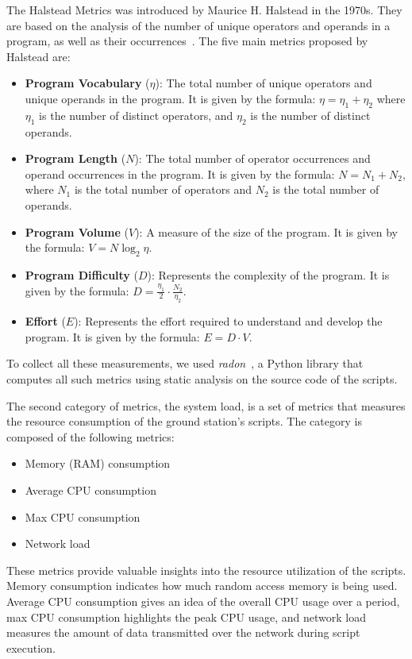 The Halstead Metrics was introduced by Maurice H. Halstead in the 1970s. 
They are based on the analysis of the number of unique operators and operands in a program, as well as their occurrences~\cite{hariprasad2017software}.
The five main metrics proposed by Halstead are:
\begin{itemize}
    \item \textbf{Program Vocabulary} (\( \eta \)): The total number of unique operators and unique operands in the program. 
    It is given by the formula: \( \eta = \eta_1 + \eta_2 \) where \( \eta_1 \) is the number of distinct operators, and  \( \eta_2 \) is the number of distinct operands.
    \item \textbf{Program Length} (\( N \)): The total number of operator occurrences and operand occurrences in the program. It is given by the formula: \( N = N_1 + N_2 \), where \( N_1 \) is the total number of operators and \( N_2 \) is the total number of operands.
    \item \textbf{Program Volume} (\( V \)): A measure of the size of the program. It is given by the formula: \( V = N \log_2 \eta \).
    \item \textbf{Program Difficulty} (\( D \)): Represents the complexity of the program. It is given by the formula: \( D = \frac{\eta_1}{2} \cdot \frac{N_2}{\eta_2} \).
    \item \textbf{Effort} (\( E \)): Represents the effort required to understand and develop the program. It is given by the formula: \( E = D \cdot V \).
\end{itemize}

To collect all these measurements, we used \textit{radon}~\cite{radon}, a Python library that computes all such metrics using static analysis on the source code of the scripts.

The second category of metrics, the system load, is a set of metrics that measures the resource consumption of the ground station's scripts.
The category is composed of the following metrics:
\begin{itemize}
    \item Memory (RAM) consumption
    \item Average CPU consumption 
    \item Max CPU consumption
    \item Network load
\end{itemize}

These metrics provide valuable insights into the resource utilization of the scripts. 
Memory consumption indicates how much random access memory is being used. 
Average CPU consumption gives an idea of the overall CPU usage over a period, max CPU consumption highlights the peak CPU usage, and network load measures the amount of data transmitted over the network during script execution.

